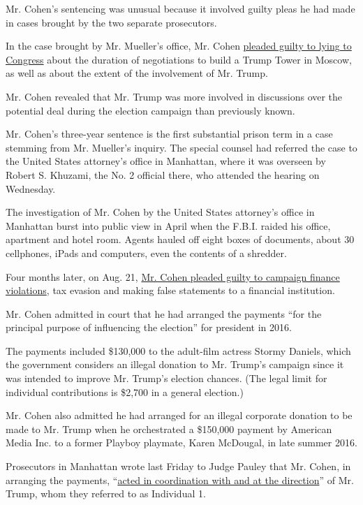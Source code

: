 Mr. Cohen's sentencing was unusual because it involved guilty pleas he
had made in cases brought by the two separate prosecutors.

In the case brought by Mr. Mueller's office, Mr. Cohen
\href{https://www.nytimes.com/2018/11/29/nyregion/michael-cohen-trump-russia-mueller.html}{pleaded
guilty to lying to Congress} about the duration of negotiations to build
a Trump Tower in Moscow, as well as about the extent of the involvement
of Mr. Trump.

Mr. Cohen revealed that Mr. Trump was more involved in discussions over
the potential deal during the election campaign than previously known.

Mr. Cohen's three-year sentence is the first substantial prison term in
a case stemming from Mr. Mueller's inquiry. The special counsel had
referred the case to the United States attorney's office in Manhattan,
where it was overseen by Robert S. Khuzami, the No. 2 official there,
who attended the hearing on Wednesday.

The investigation of Mr. Cohen by the United States attorney's office in
Manhattan burst into public view in April when the F.B.I. raided his
office, apartment and hotel room. Agents hauled off eight boxes of
documents, about 30 cellphones, iPads and computers, even the contents
of a shredder.

Four months later, on Aug. 21,
\href{https://www.nytimes.com/2018/08/21/nyregion/michael-cohen-plea-deal-trump.html}{Mr.
Cohen pleaded guilty to campaign finance violations}, tax evasion and
making false statements to a financial institution.

Mr. Cohen admitted in court that he had arranged the payments ``for the
principal purpose of influencing the election'' for president in 2016.

The payments included \$130,000 to the adult-film actress Stormy
Daniels, which the government considers an illegal donation to Mr.
Trump's campaign since it was intended to improve Mr. Trump's election
chances. (The legal limit for individual contributions is \$2,700 in a
general election.)

Mr. Cohen also admitted he had arranged for an illegal corporate
donation to be made to Mr. Trump when he orchestrated a \$150,000
payment by American Media Inc. to a former Playboy playmate, Karen
McDougal, in late summer 2016.

Prosecutors in Manhattan wrote last Friday to Judge Pauley that Mr.
Cohen, in arranging the payments,
``\href{https://www.nytimes.com/2018/12/07/nyregion/michael-cohen-sentence.html}{acted
in coordination with and at the direction}'' of Mr. Trump, whom they
referred to as Individual 1.

